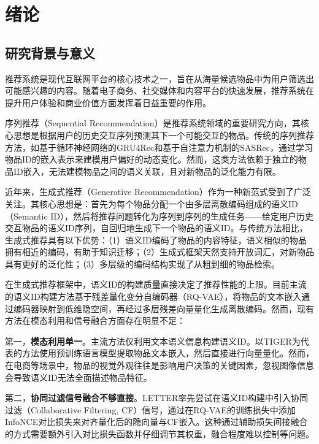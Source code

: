 
\chapter{绪论}

\section{研究背景与意义}

推荐系统是现代互联网平台的核心技术之一，旨在从海量候选物品中为用户筛选出可能感兴趣的内容。随着电子商务、社交媒体和内容平台的快速发展，推荐系统在提升用户体验和商业价值方面发挥着日益重要的作用。

序列推荐（Sequential Recommendation）是推荐系统领域的重要研究方向，其核心思想是根据用户的历史交互序列预测其下一个可能交互的物品。传统的序列推荐方法，如基于循环神经网络的GRU4Rec\cite{hidasi2016session}和基于自注意力机制的SASRec\cite{kang2018self}，通过学习物品ID的嵌入表示来建模用户偏好的动态变化。然而，这类方法依赖于独立的物品ID嵌入，无法建模物品之间的语义关联，且对新物品的泛化能力有限。

近年来，生成式推荐（Generative Recommendation）作为一种新范式受到了广泛关注\cite{rajput2023recommender,zheng2024adapting}。其核心思想是：首先为每个物品分配一个由多层离散编码组成的语义ID（Semantic ID），然后将推荐问题转化为序列到序列的生成任务——给定用户历史交互物品的语义ID序列，自回归地生成下一个物品的语义ID。与传统方法相比，生成式推荐具有以下优势：（1）语义ID编码了物品的内容特征，语义相似的物品拥有相近的编码，有助于知识迁移；（2）生成式框架天然支持开放词汇，对新物品具有更好的泛化性；（3）多层级的编码结构实现了从粗到细的物品检索。

在生成式推荐框架中，语义ID的构建质量直接决定了推荐性能的上限。目前主流的语义ID构建方法基于残差量化变分自编码器（RQ-VAE）\cite{lee2022autoregressive,rajput2023recommender}，将物品的文本嵌入通过编码器映射到低维隐空间，再经过多层残差向量量化生成离散编码。然而，现有方法在模态利用和信号融合方面存在明显不足：

第一，\textbf{模态利用单一}。主流方法仅利用文本语义信息构建语义ID。以TIGER\cite{rajput2023recommender}为代表的方法使用预训练语言模型提取物品文本嵌入，然后直接进行向量量化。然而，在电商等场景中，物品的视觉外观往往是影响用户决策的关键因素，忽视图像信息会导致语义ID无法全面描述物品特征。

第二，\textbf{协同过滤信号融合不够直接}。LETTER\cite{wang2024learnable}率先尝试在语义ID构建中引入协同过滤（Collaborative Filtering, CF）信号，通过在RQ-VAE的训练损失中添加InfoNCE对比损失来对齐量化后的隐向量与CF嵌入。这种通过辅助损失间接融合的方式需要额外引入对比损失函数并仔细调节其权重，融合程度难以控制等问题。

